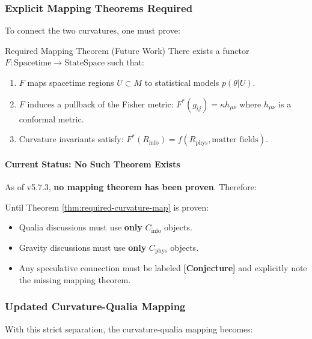 \documentclass[11pt,titlepage]{article}
\begin{document}
\subsubsection{Explicit Mapping Theorems Required}
To connect the two curvatures, one must prove:

\begin{mytheorem}{Required Mapping Theorem (Future Work)}
\label{thm:required-curvature-map}
There exists a functor $F: \text{Spacetime} \to \text{StateSpace}$ such that:
\begin{enumerate}
\item $F$ maps spacetime regions $U \subset M$ to statistical models $p(\theta|U)$.
\item $F$ induces a pullback of the Fisher metric: $F^*(g_{ij}) = \kappa h_{\mu\nu}$ where $h_{\mu\nu}$ is a conformal metric.
\item Curvature invariants satisfy: $F^*(R_{\mathrm{info}}) = f(R_{\mathrm{phys}}, \text{matter fields})$.
\end{enumerate}
\end{mytheorem}

\paragraph{Current Status: No Such Theorem Exists}
As of v5.7.3, \textbf{no mapping theorem has been proven}. Therefore:

\begin{tcolorbox}[colback=yellow!5!white,colframe=yellow!75!black,title=Interim Protocol]
Until Theorem \ref{thm:required-curvature-map} is proven:
\begin{itemize}
\item Qualia discussions must use \textbf{only} $C_{\mathrm{info}}$ objects.
\item Gravity discussions must use \textbf{only} $C_{\mathrm{phys}}$ objects.
\item Any speculative connection must be labeled \textbf{[Conjecture]} and explicitly note the missing mapping theorem.
\end{itemize}
\end{tcolorbox}

\subsubsection{Updated Curvature-Qualia Mapping}
With this strict separation, the curvature-qualia mapping becomes:
\end{document}
